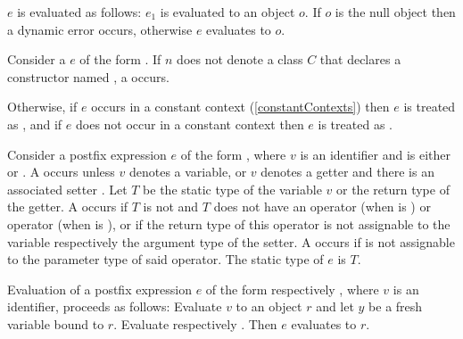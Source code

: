 \documentclass[makeidx]{article}
\begin{document}
\LMHash{}%
$e$ is evaluated as follows: $e_1$ is evaluated to an object $o$.
If $o$ is the null object then a dynamic error occurs,
otherwise $e$ evaluates to $o$.
\EndCase

\LMHash{}%
Consider a  $e$ of the form
.
If $n$ does not denote a class $C$
that declares a constructor named ,
a  occurs.

\LMHash{}%
Otherwise, if $e$ occurs in a constant context
(\ref{constantContexts})
then $e$ is treated as ,
and if $e$ does not occur in a constant context
then $e$ is treated as .

\EndCase

\LMHash{}%
Consider a postfix expression $e$ of the form ,
where $v$ is an identifier and \op{} is either \lit{++} or \lit{-{}-}.
A  occurs unless $v$ denotes a variable,
or $v$ denotes a getter and there is an associated setter .
Let $T$ be the static type of the variable $v$ or the return type of the getter.
A  occurs if $T$ is not \DYNAMIC{}
and $T$ does not have an operator \lit{+} (when \op{} is \lit{++})
or operator \lit{-} (when \op{} is \lit{-{}-}),
or if the return type of this operator is not assignable to
the variable respectively the argument type of the setter.
A  occurs if  is not assignable to
the parameter type of said operator.
The static type of $e$ is $T$.

\LMHash{}%
Evaluation of a postfix expression $e$
of the form  respectively ,
where $v$ is an identifier, proceeds as follows:
Evaluate $v$ to an object $r$ and let $y$ be a fresh variable bound to $r$.
Evaluate  respectively .
Then $e$ evaluates to $r$.
\end{document}
